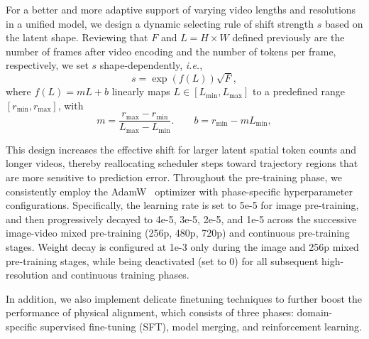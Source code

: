 \documentclass{llmxive}
\begin{document}
For a better and more adaptive support of varying video lengths and resolutions in a unified model, we design a dynamic selecting rule of shift strength $s$ based on the latent shape. Reviewing that $F$ and $L=H\times W$ defined previously are the number of frames after video encoding and the number of tokens per frame, respectively, we set $s$ shape-dependently, \textit{i.e.},
\begin{equation}
    s = \exp(f(L))\sqrt{F},
\end{equation}
where $f(L) = mL + b$ linearly maps $L \in [L_{\min}, L_{\max}]$ to a predefined range $[r_{\min}, r_{\max}]$, with
\begin{equation}
m = \frac{r_{\max}-r_{\min}}{L_{\max}-L_{\min}}.
\qquad
b = r_{\min} - mL_{\min},
\label{eq:kairos_mu_coeffs}
\end{equation}


This design increases the effective shift for larger latent spatial token counts and longer videos, thereby reallocating scheduler steps toward trajectory regions that are more sensitive to prediction error. Throughout the pre-training phase, we consistently employ the AdamW~\citep{loshchilov2019decoupledweightdecayregularization} optimizer with phase-specific hyperparameter configurations. Specifically, the learning rate is set to 5e-5 for image pre-training, and then progressively decayed to 4e-5, 3e-5, 2e-5, and 1e-5 across the successive image-video mixed pre-training (256p, 480p, 720p) and continuous pre-training stages. Weight decay is configured at 1e-3 only during the image and 256p mixed pre-training stages, while being deactivated (set to 0) for all subsequent high-resolution and continuous training phases.


In addition, we also implement delicate finetuning techniques to further boost the performance of physical alignment, which consists of three phases: domain-specific supervised fine-tuning (SFT), model merging, and reinforcement learning.
\end{document}
